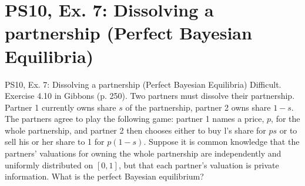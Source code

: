 \section{PS10, Ex. 7: Dissolving a partnership (Perfect Bayesian Equilibria)}

\begin{frame}{PS10, Ex. 7: Dissolving a partnership (Perfect Bayesian Equilibria)}
    Difficult. Exercise 4.10 in Gibbons (p. 250). Two partners must dissolve their partnership. Partner 1 currently owns share $s$ of the partnership, partner 2 owns share $1-s$. The partners agree to play the following game: partner 1 names a price, $p$, for the whole partnership, and partner 2 then chooses either to buy l's share for $ps$ or to sell his or her share to 1 for $p(1-s)$. Suppose it is common knowledge that the partners' valuations for owning the whole partnership are independently and uniformly distributed on $[0,1]$, but that each partner's valuation is private information. What is the perfect Bayesian equilibrium?
    \vfill\null
\end{frame}


